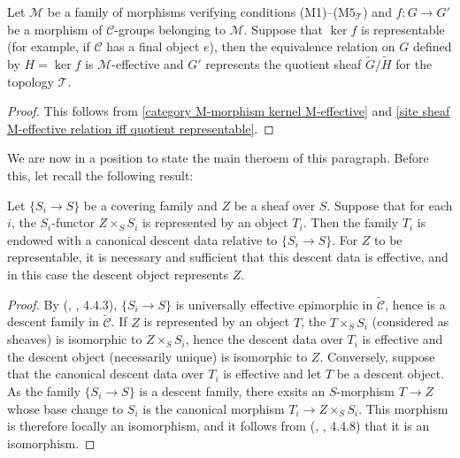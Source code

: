 \begin{corollary}\label{site sheaf M-morphism kernel M-effective}
Let $\mathcal{M}$ be a family of morphisms verifying conditions (M1)--($\text{M5}_\mathcal{T}$) and $f:G\to G'$ be a morphism of $\mathcal{C}$-groups belonging to $\mathcal{M}$. Suppose that $\ker f$ is representable (for example, if $\mathcal{C}$ has a final object $e$), then the equivalence relation on $G$ defined by $H=\ker f$ is $\mathcal{M}$-effective and $G'$ represents the quotient sheaf $\widetilde{G}/\widetilde{H}$ for the topology $\mathcal{T}$.
\end{corollary}
\begin{proof}
This follows from \cref{category M-morphism kernel M-effective} and \cref{site sheaf M-effective relation iff quotient representable}.
\end{proof}

We are now in a position to state the main theroem of this paragraph. Before this, let recall the following result:
\begin{proposition}\label{site sheaf representable iff descent data effective}
Let $\{S_i\to S\}$ be a covering family and $Z$ be a sheaf over $S$. Suppose that for each $i$, the $S_i$-functor $Z\times_SS_i$ is represented by an object $T_i$. Then the family $T_i$ is endowed with a canonical descent data relative to $\{S_i\to S\}$. For $Z$ to be representable, it is necessary and sufficient that this descent data is effective, and in this case the descent object represents $Z$.
\end{proposition}
\begin{proof}
By (\cite{SGA3-1}, , 4.4.3), $\{S_i\to S\}$ is universally effective epimorphic in $\widetilde{\mathcal{C}}$, hence is a descent family in $\widetilde{\mathcal{C}}$. If $Z$ is represented by an object $T$, the $T\times_SS_i$ (considered as sheaves) is isomorphic to $Z\times_SS_i$, hence the descent data over $T_i$ is effective and the descent object (necessarily unique) is isomorphic to $Z$. Conversely, suppose that the canonical descent data over $T_i$ is effective and let $T$ be a descent object. As the family $\{S_i\to S\}$ is a descent family, there exsits an $S$-morphism $T\to Z$ whose base change to $S_i$ is the canonical morphism $T_i\to Z\times_SS_i$. This morphism is therefore locally an isomorphism, and it follows from (\cite{SGA3-1}, , 4.4.8) that it is an isomorphism.
\end{proof}

